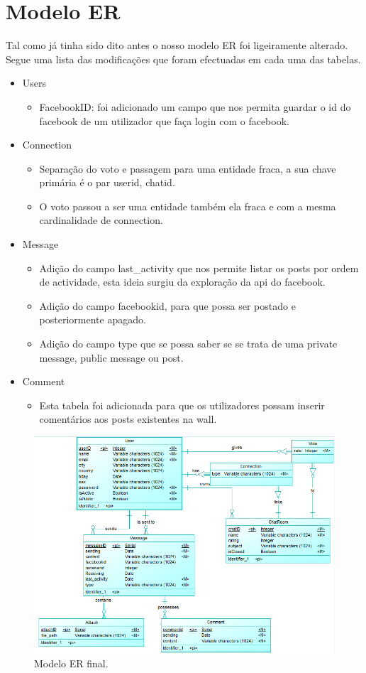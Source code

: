 \documentclass[a4paper, 12pt]{article}
\begin{document}
\section{Modelo ER}
\indent \indent Tal como já tinha sido dito antes o nosso modelo ER foi ligeiramente alterado. Segue uma lista das modificações que foram efectuadas em cada uma das tabelas.
\begin{itemize}
	\item Users
	\begin{itemize}
		\item FacebookID: foi adicionado um campo que nos permita guardar o id do facebook de um utilizador que faça login com o facebook.
	\end{itemize}
	\item Connection
	\begin{itemize}
		\item Separação do voto e passagem para uma entidade fraca, a sua chave primária é o par userid, chatid.
		\item O voto passou a ser uma entidade também ela fraca e com a mesma cardinalidade de connection.
	\end{itemize}
	\item Message
	\begin{itemize}
		\item Adição do campo last\_activity que nos permite listar os posts por ordem de actividade, esta ideia surgiu da exploração da api do facebook.
		\item Adição do campo facebookid, para que possa ser postado e posteriormente apagado.
		\item Adição do campo type que se possa saber se se trata de uma private message, public message ou post.
	\end{itemize}
	\item Comment
	\begin{itemize}
		\item Esta tabela foi adicionada para que os utilizadores possam inserir comentários aos posts existentes na wall.
	\end{itemize}
\end{itemize}
\begin{figure}[h]
	\includegraphics[keepaspectratio=true, height=0.43\textheight]{er}
	\caption{Modelo ER final.}
\end{figure}
\end{document}
